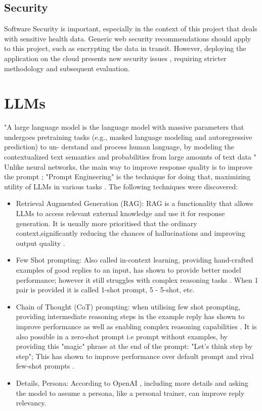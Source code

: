 \subsection{Security}
Software Security is important, especially in the context of this project that deals with sensitive health data. Generic web security recommendations should apply to this project, such as encrypting the data in transit. However, deploying the application on the cloud presents new security issues \cite{Zissis2012Addressing}, requiring stricter methodology and subsequent evaluation.
\section{LLMs}
"A large language model is the language model with massive
parameters that undergoes pretraining tasks (e.g., masked
language modeling and autoregressive prediction) to un-
derstand and process human language, by modeling the
contextualized text semantics and probabilities from large
amounts of text data " \cite{Yao2023ASO}
Unlike neural networks, the main way to improve response quality is to improve the prompt \cite{Liu2021PretrainPA}; "Prompt Engineering" is the technique for doing that, maximizing utility of LLMs in various tasks \cite{zhou2023large}. The following techniques were discovered:
\begin{itemize}
   \item Retrieval Augmented Generation (RAG): RAG is a functionality that allows LLMs to access relevant external knowledge and use it for response generation. It is usually more prioritised that the ordinary context,significantly reducing the chances of hallucinations and improving output quality \cite{gao2024retrievalaugmented}.
   \item Few Shot prompting: Also called in-context learning, providing hand-crafted examples of good replies to an input, has shown to provide better model performance; however it still struggles with complex reasoning tasks \cite{brown2020language, min2022rethinking}. When 1 pair is provided it is called 1-shot prompt, 5 - 5-shot, etc. 
   \item Chain of Thought (CoT) prompting: when utilising few shot prompting, providing intermediate reasoning steps in the example reply has shown to improve performance as well as enabling complex reasoning capabilities \cite{wei2023chainofthought}. It is also possible in a zero-shot prompt i.e prompt without examples, by providing this "magic" phrase at the end of the prompt: "Let's think step by step"; This has shown to improve performance over default prompt and rival few-shot prompts \cite{kojima2023large}.
   \item Details, Persona: According to OpenAI \cite{openAI}, including more details and asking the model to assume a persona, like a personal trainer, can improve reply relevancy. 
\end{itemize}
